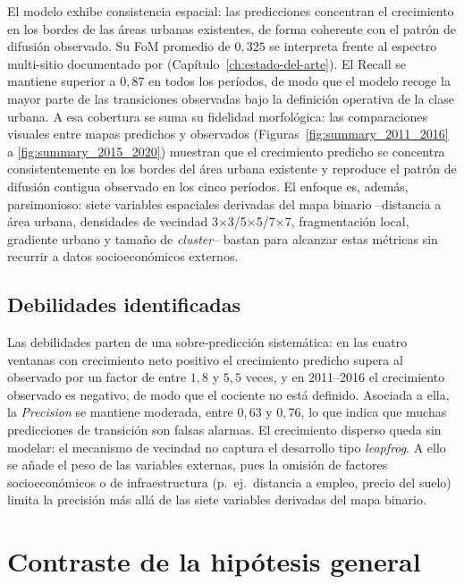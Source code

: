 El modelo exhibe consistencia espacial: las predicciones concentran el crecimiento en los bordes de las áreas urbanas existentes, de forma coherente con el patrón de difusión observado. Su FoM promedio de $0{,}325$ se interpreta frente al espectro multi-sitio documentado por \textcite{pontius2008comparing} (Capítulo~\ref{ch:estado-del-arte}). El Recall se mantiene superior a $0{,}87$ en todos los períodos, de modo que el modelo recoge la mayor parte de las transiciones observadas bajo la definición operativa de la clase urbana. A esa cobertura se suma su fidelidad morfológica: las comparaciones visuales entre mapas predichos y observados (Figuras~\ref{fig:summary_2011_2016} a \ref{fig:summary_2015_2020}) muestran que el crecimiento predicho se concentra consistentemente en los bordes del área urbana existente y reproduce el patrón de difusión contigua observado en los cinco períodos. El enfoque es, además, parsimonioso: siete variables espaciales derivadas del mapa binario --distancia a área urbana, densidades de vecindad 3$\times$3/5$\times$5/7$\times$7, fragmentación local, gradiente urbano y tamaño de \textit{cluster}-- bastan para alcanzar estas métricas sin recurrir a datos socioeconómicos externos.

\subsection{Debilidades identificadas}

Las debilidades parten de una sobre-predicción sistemática: en las cuatro ventanas con crecimiento neto positivo el crecimiento predicho supera al observado por un factor de entre $1{,}8$ y $5{,}5$ veces, y en 2011--2016 el crecimiento observado es negativo, de modo que el cociente no está definido. Asociada a ella, la \textit{Precision} se mantiene moderada, entre $0{,}63$ y $0{,}76$, lo que indica que muchas predicciones de transición son falsas alarmas. El crecimiento disperso queda sin modelar: el mecanismo de vecindad no captura el desarrollo tipo \textit{leapfrog}. A ello se añade el peso de las variables externas, pues la omisión de factores socioeconómicos o de infraestructura (p.\ ej.\ distancia a empleo, precio del suelo) limita la precisión más allá de las siete variables derivadas del mapa binario.

\section{Contraste de la hipótesis general}

